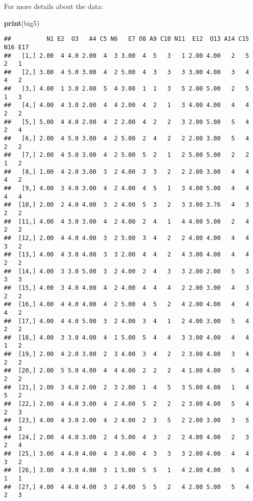 \documentclass[]{article}
\newenvironment{Shaded}{\begin{snugshade}}{\end{snugshade}}
\newcommand{\KeywordTok}[1]{\textcolor[rgb]{0.13,0.29,0.53}{\textbf{#1}}}
\newcommand{\NormalTok}[1]{#1}
\begin{document}
For more details about the data:

\begin{Shaded}
\begin{Highlighting}[]
\KeywordTok{print}\NormalTok{(big5)}
\end{Highlighting}
\end{Shaded}

\begin{verbatim}
##          N1 E2  O3   A4 C5 N6   E7 O8 A9 C10 N11  E12  O13 A14 C15 N16 E17
##   [1,] 2.00  4 4.0 2.00  4  3 3.00  4  5   3   1 2.00 4.00   2   5   2   1
##   [2,] 3.00  4 5.0 3.00  4  2 5.00  4  3   3   3 3.00 4.00   3   4   4   2
##   [3,] 4.00  1 3.0 2.00  5  4 3.00  1  1   3   5 2.00 5.00   2   5   1   3
##   [4,] 4.00  4 3.0 2.00  4  4 2.00  4  2   1   3 4.00 4.00   4   4   2   2
##   [5,] 5.00  4 4.0 2.00  4  2 2.00  4  2   2   3 2.00 5.00   5   4   2   4
##   [6,] 2.00  4 5.0 3.00  4  2 5.00  2  4   2   2 2.00 3.00   5   4   2   2
##   [7,] 2.00  4 5.0 3.00  4  2 5.00  5  2   1   2 5.00 5.00   2   2   1   2
##   [8,] 1.00  4 2.0 3.00  3  2 4.00  3  3   2   2 2.00 3.00   4   4   4   2
##   [9,] 4.00  3 4.0 3.00  4  2 4.00  4  5   1   3 4.00 5.00   4   4   4   4
##  [10,] 2.00  2 4.0 4.00  3  2 4.00  5  3   2   3 3.00 3.76   4   3   2   2
##  [11,] 4.00  4 3.0 3.00  4  2 4.00  2  4   1   4 4.00 5.00   2   4   2   2
##  [12,] 2.00  4 4.0 4.00  3  2 5.00  3  4   2   2 4.00 4.00   4   4   3   2
##  [13,] 4.00  4 3.0 4.00  3  3 2.00  4  4   2   4 3.00 4.00   4   4   2   2
##  [14,] 4.00  3 3.0 5.00  3  2 4.00  2  4   3   3 2.00 2.00   5   3   3   3
##  [15,] 4.00  3 4.0 4.00  4  2 4.00  4  4   4   2 2.00 3.00   4   3   2   2
##  [16,] 4.00  4 4.0 4.00  4  2 5.00  4  5   2   4 2.00 4.00   4   4   4   2
##  [17,] 4.00  4 4.0 5.00  3  2 4.00  3  4   1   2 4.00 3.00   5   4   2   2
##  [18,] 4.00  3 3.0 4.00  4  1 5.00  5  4   4   3 3.00 4.00   4   4   1   2
##  [19,] 2.00  4 2.0 3.00  2  3 4.00  3  4   2   2 3.00 4.00   3   4   2   2
##  [20,] 2.00  5 5.0 4.00  4  4 4.00  2  2   2   4 1.00 4.00   5   4   2   2
##  [21,] 2.00  3 4.0 2.00  2  3 2.00  1  4   5   3 5.00 4.00   1   4   5   2
##  [22,] 2.00  4 4.0 3.00  4  2 4.00  5  2   2   2 3.00 4.00   5   4   2   3
##  [23,] 4.00  4 3.0 2.00  4  2 4.00  2  3   5   2 2.00 3.00   3   5   4   3
##  [24,] 2.00  4 4.0 3.00  2  4 5.00  4  3   2   2 4.00 4.00   2   3   2   4
##  [25,] 3.00  4 4.0 4.00  4  3 4.00  4  3   3   3 2.00 4.00   4   4   3   2
##  [26,] 3.00  4 3.0 4.00  3  1 5.00  5  5   1   4 2.00 4.00   5   4   1   1
##  [27,] 4.00  4 4.0 4.00  3  2 4.00  5  5   2   4 2.00 5.00   5   4   2   3

\end{verbatim}
\end{document}
